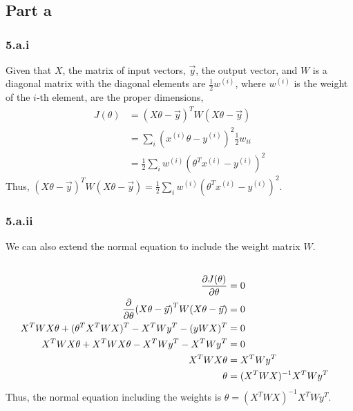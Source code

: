\documentclass[11pt,a4paper,titlepage]{article}
\begin{document}
\section{}{
\subsection*{Part a}{
\subsubsection*{5.a.i}{%
\quad Given that $X$, the matrix of input vectors, $\vec{y}$, the output vector, and $W$ is a diagonal matrix with the diagonal elements are $\frac{1}{2} w^{(i)}$, where $w^{(i)}$ is the weight of the $i$-th element, are the proper dimensions, 
\begin{align*}
	J(\theta) &= (X\theta - \vec{y})^TW(X\theta - \vec{y})
    \\&= \sum_i (x^{(i)}\theta-y^{(i)})^2\frac{1}{2}w_{ii}
    \\&= \frac{1}{2} \sum_i w^{(i)}(\theta^Tx^{(i)}-y^{(i)})^2
\end{align*}
Thus, $(X\theta - \vec{y})^TW(X\theta - \vec{y}) = \frac{1}{2} \sum_i w^{(i)}(\theta^Tx^{(i)}-y^{(i)})^2$.
}\label{prob:5a1}
\subsubsection*{5.a.ii}{
We can also extend the normal equation to include the weight matrix $W$.
\begin{align*}
	\\ \pdv{J(\theta)}{\theta} &= 0
	\\ \pdv{\theta} (X\theta - \vec{y})^TW(X\theta - \vec{y}) &= 0
    \\ X^TWX\theta + (\theta^TX^TWX)^T - X^TWy^T - (yWX)^T &= 0
    \\ X^TWX\theta + X^TWX\theta - X^TWy^T - X^TWy^T &= 0
  \\X^TWX\theta &= X^TWy^T
  \\ \theta &= (X^TWX)^{-1}X^TWy^T
\end{align*}
Thus, the normal equation including the weights is $\theta = (X^TWX)^{-1}X^TWy^T$.
}\label{prob:5a2}
}}
\end{document}
